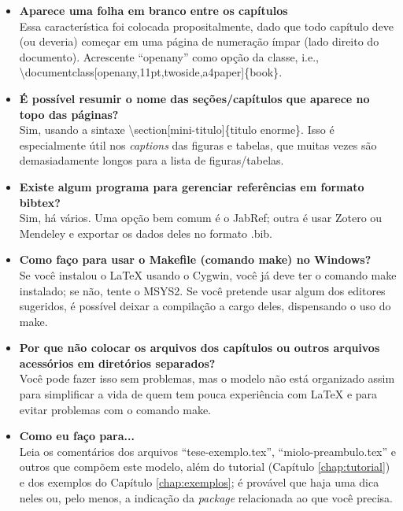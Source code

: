 \begin{itemize}
\item \textbf{Aparece uma folha em branco entre os capítulos}\\
Essa característica foi colocada propositalmente, dado que todo capítulo deve (ou deveria) começar em uma página de numeração ímpar (lado direito do documento). Acrescente ``openany'' como opção da classe, i.e., \textsf{\textbackslash{}documentclass[openany,\linebreak[0]{}11pt,twoside,a4paper]\{book\}}.

\item \textbf{É possível resumir o nome das seções/capítulos que aparece no topo das páginas?}\\
Sim, usando a sintaxe \textsf{\textbackslash{}section[mini-titulo]\{titulo enorme\}}. Isso é especialmente útil nos \textit{captions} das figuras e tabelas, que muitas vezes são demasiadamente longos para a lista de figuras/tabelas.

\item \textbf{Existe algum programa para gerenciar referências em formato bibtex?}\\
Sim, há vários. Uma opção bem comum é o JabRef; outra é usar Zotero ou Mendeley e exportar os dados deles no formato .bib.

\item \textbf{Como faço para usar o Makefile (comando make) no Windows?}\\
Se você instalou o \LaTeX{} usando o Cygwin, você já deve ter o comando make instalado; se não, tente o MSYS2. Se você pretende usar algum dos editores sugeridos, é possível deixar a compilação a cargo deles, dispensando o uso do make.

\item \textbf{Por que não colocar os arquivos dos capítulos ou outros arquivos acessórios em diretórios separados?}\\
Você pode fazer isso sem problemas, mas o modelo não está organizado assim para simplificar a vida de quem tem pouca experiência com \LaTeX{} e para evitar problemas com o comando \textsf{make}.

\item \textbf{Como eu faço para...}\\
Leia os comentários dos arquivos ``tese-exemplo.tex'', ``miolo-preambulo.tex'' e outros que compõem este modelo, além do tutorial (Capítulo \ref{chap:tutorial}) e dos exemplos do Capítulo \ref{chap:exemplos}; é provável que haja uma dica neles ou, pelo menos, a indicação da \textit{package} relacionada ao que você precisa.

\end{itemize}
